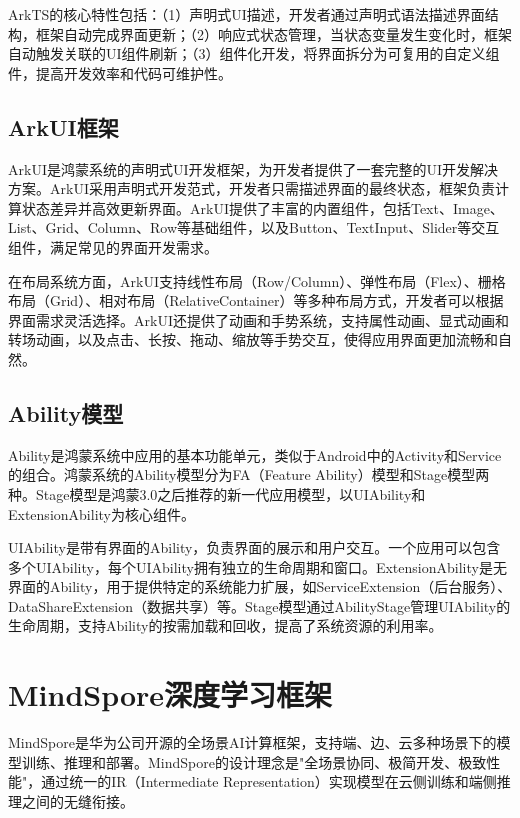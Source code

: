 ArkTS的核心特性包括：（1）声明式UI描述，开发者通过声明式语法描述界面结构，框架自动完成界面更新；（2）响应式状态管理，当状态变量发生变化时，框架自动触发关联的UI组件刷新；（3）组件化开发，将界面拆分为可复用的自定义组件，提高开发效率和代码可维护性。

\subsection{ArkUI框架}

ArkUI是鸿蒙系统的声明式UI开发框架，为开发者提供了一套完整的UI开发解决方案。ArkUI采用声明式开发范式，开发者只需描述界面的最终状态，框架负责计算状态差异并高效更新界面。ArkUI提供了丰富的内置组件，包括Text、Image、List、Grid、Column、Row等基础组件，以及Button、TextInput、Slider等交互组件，满足常见的界面开发需求。

在布局系统方面，ArkUI支持线性布局（Row/Column）、弹性布局（Flex）、栅格布局（Grid）、相对布局（RelativeContainer）等多种布局方式，开发者可以根据界面需求灵活选择。ArkUI还提供了动画和手势系统，支持属性动画、显式动画和转场动画，以及点击、长按、拖动、缩放等手势交互，使得应用界面更加流畅和自然。

\subsection{Ability模型}

Ability是鸿蒙系统中应用的基本功能单元，类似于Android中的Activity和Service的组合。鸿蒙系统的Ability模型分为FA（Feature Ability）模型和Stage模型两种。Stage模型是鸿蒙3.0之后推荐的新一代应用模型，以UIAbility和ExtensionAbility为核心组件。

UIAbility是带有界面的Ability，负责界面的展示和用户交互。一个应用可以包含多个UIAbility，每个UIAbility拥有独立的生命周期和窗口。ExtensionAbility是无界面的Ability，用于提供特定的系统能力扩展，如ServiceExtension（后台服务）、DataShareExtension（数据共享）等。Stage模型通过AbilityStage管理UIAbility的生命周期，支持Ability的按需加载和回收，提高了系统资源的利用率。

\section{MindSpore深度学习框架}

MindSpore是华为公司开源的全场景AI计算框架，支持端、边、云多种场景下的模型训练、推理和部署\cite{mindspore2021lite}。MindSpore的设计理念是"全场景协同、极简开发、极致性能"，通过统一的IR（Intermediate Representation）实现模型在云侧训练和端侧推理之间的无缝衔接。


